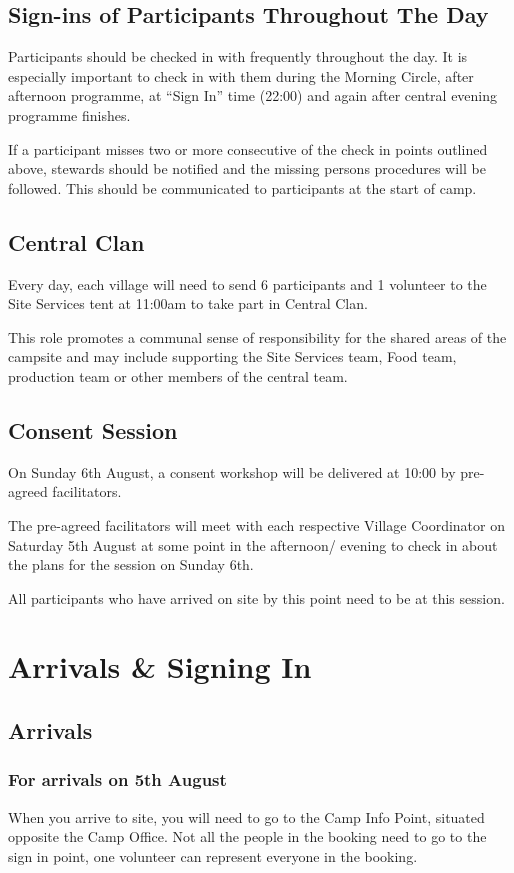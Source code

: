 \documentclass[a4paper, 11pt]{report}
\begin{document}
\section{Sign-ins of Participants Throughout The Day}
Participants should be checked in with frequently throughout the day. It is especially important to check in with them during the Morning Circle, after afternoon programme, at “Sign In” time (22:00) and again after central evening programme finishes. \nl

If a participant misses two or more consecutive of the check in points outlined above, stewards should be notified and the missing persons procedures will be followed. This should be communicated to participants at the start of camp.

\section{Central Clan}
Every day, each village will need to send 6 participants and 1 volunteer to the Site Services tent at 11:00am to take part in Central Clan.\nl

This role promotes a communal sense of responsibility for the shared areas of the campsite and may include supporting the Site Services team, Food team, production team or other members of the central team.

\section{Consent Session}
On Sunday 6th August, a consent workshop will be delivered at 10:00 by pre-agreed facilitators.\nl

The pre-agreed facilitators will meet with each respective Village Coordinator on Saturday 5th August at some point in the afternoon/ evening to check in about the plans for the session on Sunday 6th. \nl

All participants who have arrived on site by this point need to be at this session. 

\chapter{Arrivals \& Signing In}
\section{Arrivals}
\subsection{For arrivals on 5th August}
When you arrive to site, you will need to go to the Camp Info Point, situated opposite the Camp Office. Not all the people in the booking need to go to the sign in point, one volunteer can represent everyone in the booking. 
\end{document}
